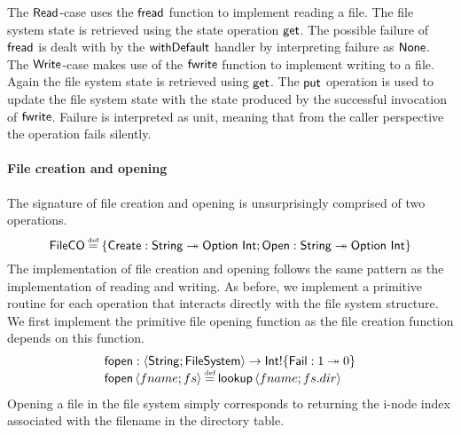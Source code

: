 \documentclass[12pt,phd,lfcs,twoside,openright,logo,leftchapter,normalheadings]{infthesis}
\theoremstyle{plain}
\theoremstyle{definition}
\begin{document}
%
The $\mathsf{Read}$-case uses the $\mathsf{fread}$ function to implement reading a
file. The file system state is retrieved using the state operation
$\mathsf{get}$. The possible failure of $\mathsf{fread}$ is dealt with by the
$\mathsf{withDefault}$ handler by interpreting failure as $\mathsf{None}$.
%
The $\mathsf{Write}$-case makes use of the $\mathsf{fwrite}$ function to implement
writing to a file. Again the file system state is retrieved using
$\mathsf{get}$. The $\mathsf{put}$ operation is used to update the file system state
with the state produced by the successful invocation of
$\mathsf{fwrite}$. Failure is interpreted as unit, meaning that from the
caller perspective the operation fails silently.

\paragraph{File creation and opening}
The signature of file creation and opening is unsurprisingly comprised
of two operations.
%
\[
  \dec{FileCO} \defas \{\UCreate : \String \opto \Option~\Int; \UOpen : \String \opto \Option~\Int\}
\]
%
The implementation of file creation and opening follows the same
pattern as the implementation of reading and writing. As before, we
implement a primitive routine for each operation that interacts
directly with the file system structure. We first implement the
primitive file opening function as the file creation function depends
on this function.
%
\[
  \bl
    \fopen : \Record{\String;\FileSystem} \to \Int \eff \{\Fail : \UnitType \opto \ZeroType\}\\
    \fopen\,\Record{fname;fs} \defas \lookup\,\Record{fname; fs.dir}
  \el
\]
%
Opening a file in the file system simply corresponds to returning the
i-node index associated with the filename in the directory table.
\end{document}
